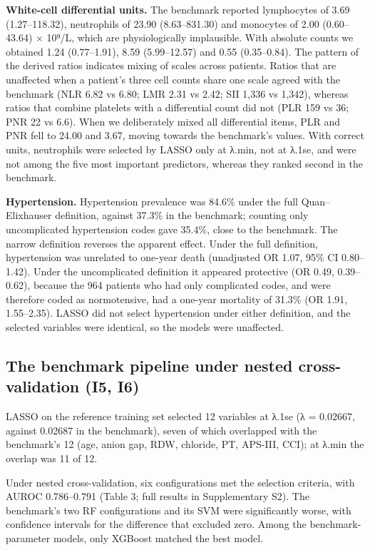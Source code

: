 \textbf{White-cell differential units.} The benchmark reported lymphocytes of
3.69 (1.27--118.32), neutrophils of 23.90 (8.63--831.30) and monocytes of 2.00
(0.60--43.64) × 10⁹/L, which are physiologically implausible. With absolute
counts we obtained 1.24 (0.77--1.91), 8.59 (5.99--12.57) and 0.55 (0.35--0.84).
The pattern of the derived ratios indicates mixing of scales across patients.
Ratios that are unaffected when a patient's three cell counts share one scale
agreed with the benchmark (NLR 6.82 vs 6.80; LMR 2.31 vs 2.42; SII 1,336 vs
1,342), whereas ratios that combine platelets with a differential count did not
(PLR 159 vs 36; PNR 22 vs 6.6). When we deliberately mixed all differential
items, PLR and PNR fell to 24.00 and 3.67, moving towards the benchmark's
values. With correct units, neutrophils were selected by LASSO only at λ.min,
not at λ.1se, and were not among the five most important predictors, whereas
they ranked second in the benchmark.

\textbf{Hypertension.} Hypertension prevalence was 84.6\% under the full
Quan--Elixhauser definition, against 37.3\% in the benchmark; counting only
uncomplicated hypertension codes gave 35.4\%, close to the benchmark. The narrow
definition reverses the apparent effect. Under the full definition, hypertension
was unrelated to one-year death (unadjusted OR 1.07, 95\% CI 0.80--1.42). Under
the uncomplicated definition it appeared protective (OR 0.49, 0.39--0.62),
because the 964 patients who had only complicated codes, and were therefore
coded as normotensive, had a one-year mortality of 31.3\% (OR 1.91, 1.55--2.35).
LASSO did not select hypertension under either definition, and the selected
variables were identical, so the models were unaffected.

\hypertarget{the-benchmark-pipeline-under-nested-cross-validation-i5-i6}{%
\subsection{The benchmark pipeline under nested cross-validation (I5,
I6)}\label{the-benchmark-pipeline-under-nested-cross-validation-i5-i6}}

LASSO on the reference training set selected 12 variables at λ.1se (λ = 0.02667,
against 0.02687 in the benchmark), seven of which overlapped with the
benchmark's 12 (age, anion gap, RDW, chloride, PT, APS-III, CCI); at λ.min the
overlap was 11 of 12.

Under nested cross-validation, six configurations met the selection criteria,
with AUROC 0.786--0.791 (Table 3; full results in Supplementary S2). The
benchmark's two RF configurations and its SVM were significantly worse, with
confidence intervals for the difference that excluded zero. Among the
benchmark-parameter models, only XGBoost matched the best model.

